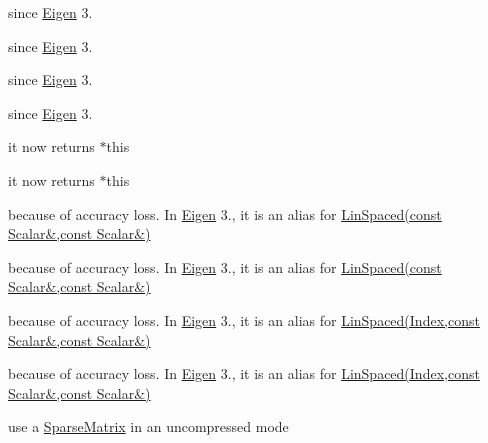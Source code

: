 \begin{DoxyRefList}
\item[\label{deprecated__deprecated000016}%
\Hypertarget{deprecated__deprecated000016}%
Member \hyperlink{group___eigenvalues___module_abc0218d8b902af0d6c759bfc0a8a8d74}{Eigen\+:\+:Complex\+Eigen\+Solver$<$ \+\_\+\+Matrix\+Type $>$\+:\+:Index} ]since \hyperlink{namespace_eigen}{Eigen} 3. 

since \hyperlink{namespace_eigen}{Eigen} 3.  
\item[\label{deprecated__deprecated000017}%
\Hypertarget{deprecated__deprecated000017}%
Member \hyperlink{group___eigenvalues___module_a652104d13723a5b1db2937866a034557}{Eigen\+:\+:Complex\+Schur$<$ \+\_\+\+Matrix\+Type $>$\+:\+:Index} ]since \hyperlink{namespace_eigen}{Eigen} 3. 

since \hyperlink{namespace_eigen}{Eigen} 3.  
\item[\label{deprecated__deprecated000005}%
\Hypertarget{deprecated__deprecated000005}%
Member \hyperlink{group___core___module_a9b3f75f76ae40439be870258e80c7346}{Eigen\+:\+:Dense\+Base$<$ Derived $>$\+:\+:flagged} () const]it now returns {\ttfamily $\ast$this} 

it now returns {\ttfamily $\ast$this}  
\item[\label{deprecated__deprecated000004}%
\Hypertarget{deprecated__deprecated000004}%
Member \hyperlink{group___core___module_ad69f2e4769d8b4e667fafba18c9cfb56}{Eigen\+:\+:Dense\+Base$<$ Derived $>$\+:\+:Lin\+Spaced} (Sequential\+\_\+t, const Scalar \&low, const Scalar \&high)]because of accuracy loss. In \hyperlink{namespace_eigen}{Eigen} 3., it is an alias for \hyperlink{group___core___module_a1dd502457286f60df1c3e90f9192c542}{Lin\+Spaced(const Scalar\&,const Scalar\&)}

because of accuracy loss. In \hyperlink{namespace_eigen}{Eigen} 3., it is an alias for \hyperlink{group___core___module_a1dd502457286f60df1c3e90f9192c542}{Lin\+Spaced(const Scalar\&,const Scalar\&)} 
\item[\label{deprecated__deprecated000003}%
\Hypertarget{deprecated__deprecated000003}%
Member \hyperlink{group___core___module_a35f222d8834f34fd358f2ef7bb52c888}{Eigen\+:\+:Dense\+Base$<$ Derived $>$\+:\+:Lin\+Spaced} (Sequential\+\_\+t, Index size, const Scalar \&low, const Scalar \&high)]because of accuracy loss. In \hyperlink{namespace_eigen}{Eigen} 3., it is an alias for \hyperlink{group___core___module_a513c7986f48517c36f992a558f81e591}{Lin\+Spaced(\+Index,const Scalar\&,const Scalar\&)}

because of accuracy loss. In \hyperlink{namespace_eigen}{Eigen} 3., it is an alias for \hyperlink{group___core___module_a513c7986f48517c36f992a558f81e591}{Lin\+Spaced(\+Index,const Scalar\&,const Scalar\&)} 
\item[\label{deprecated__deprecated000040}%
\Hypertarget{deprecated__deprecated000040}%
Class \hyperlink{class_eigen_1_1_dynamic_sparse_matrix}{Eigen\+:\+:Dynamic\+Sparse\+Matrix$<$ \+\_\+\+Scalar, \+\_\+\+Options, \+\_\+\+Storage\+Index $>$} ]use a \hyperlink{group___sparse_core___module_class_eigen_1_1_sparse_matrix}{Sparse\+Matrix} in an uncompressed mode


\end{DoxyRefList}
